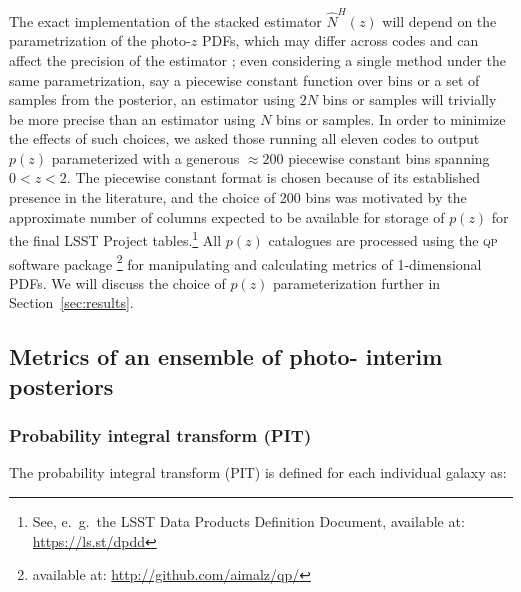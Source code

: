 The exact implementation of the stacked estimator $\hat{N}^{H}(z)$ will depend on the parametrization of the photo-$z$ PDFs, which may differ across codes and can affect the precision of the estimator \citep{Malz:qp}; even considering a single method under the same parametrization, say a piecewise constant function over bins or a set of samples from the posterior, an estimator using $2N$ bins or samples will trivially be more precise than an estimator using $N$ bins or samples.
In order to minimize the effects of such choices, we asked those running all eleven codes to output $p(z)$ parameterized with a generous $\approx 200$ piecewise constant bins spanning $0<z<2$.
The piecewise constant format is chosen because of its established presence in the literature, and the choice of 200 bins was motivated by the approximate number of columns expected to be available for storage of $p(z)$ for the final LSST Project tables.\footnote{See, e.~g.~the LSST Data Products Definition Document, available at: \url{https://ls.st/dpdd}}
All $p(z)$ catalogues are processed using the \textsc{qp} software package \citep{Malz:qp}\footnote{available at: \url{http://github.com/aimalz/qp/}} for manipulating and calculating metrics of 1-dimensional PDFs.
We will discuss the choice of $p(z)$ parameterization further in Section~\ref{sec:results}.


\subsection{Metrics of an ensemble of photo- interim posteriors}
\label{sec:qualmet}

\subsubsection{Probability integral transform (PIT)}
\label{sec:pit}

The probability integral transform (PIT) \citep{Polsterer:16} is defined for each individual galaxy as:%

